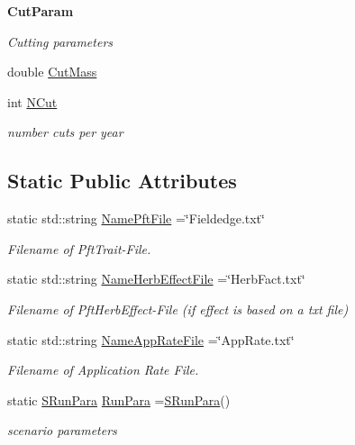 \begin{Indent}\textbf{ Cut\+Param}\par
{\em Cutting parameters }\begin{DoxyCompactItemize}
\item 
double \mbox{\hyperlink{struct_s_run_para_a79daf0a2044bb5df53350c0b99250ae5}{Cut\+Mass}}
\item 
\mbox{\label{struct_s_run_para_a3e6e6b64677e69b6cad5fc23f6e631c5}} 
int \mbox{\hyperlink{struct_s_run_para_a3e6e6b64677e69b6cad5fc23f6e631c5}{N\+Cut}}
\begin{DoxyCompactList}\small\item\em number cuts per year \end{DoxyCompactList}\end{DoxyCompactItemize}
\end{Indent}
\subsection*{Static Public Attributes}
\begin{DoxyCompactItemize}
\item 
static std\+::string \mbox{\hyperlink{struct_s_run_para_a9c98a63b836012a827e9fe97f440dae1}{Name\+Pft\+File}} =\char`\"{}Fieldedge.\+txt\char`\"{}
\begin{DoxyCompactList}\small\item\em Filename of Pft\+Trait-\/\+File. \end{DoxyCompactList}\item 
static std\+::string \mbox{\hyperlink{struct_s_run_para_a185a1dfe4962cec31af4b3328d12c8e8}{Name\+Herb\+Effect\+File}} =\char`\"{}Herb\+Fact.\+txt\char`\"{}
\begin{DoxyCompactList}\small\item\em Filename of Pft\+Herb\+Effect-\/\+File (if effect is based on a txt file) \end{DoxyCompactList}\item 
static std\+::string \mbox{\hyperlink{struct_s_run_para_af084c204866b0f3137a70730bebe7e4a}{Name\+App\+Rate\+File}} =\char`\"{}App\+Rate.\+txt\char`\"{}
\begin{DoxyCompactList}\small\item\em Filename of Application Rate File. \end{DoxyCompactList}\item 
static \mbox{\hyperlink{struct_s_run_para}{S\+Run\+Para}} \mbox{\hyperlink{struct_s_run_para_a3e7797ad861d93d0d7dd6ce23ff259b7}{Run\+Para}} =\mbox{\hyperlink{struct_s_run_para}{S\+Run\+Para}}()
\begin{DoxyCompactList}\small\item\em scenario parameters \end{DoxyCompactList}\end{DoxyCompactItemize}
